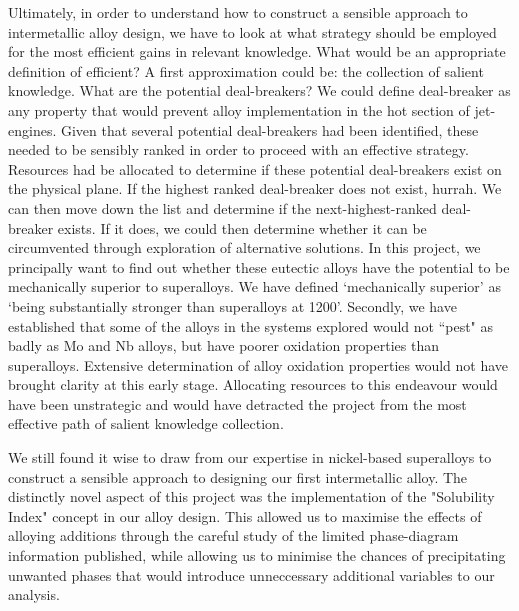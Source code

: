 Ultimately, in order to understand how to construct a sensible approach to intermetallic alloy design, we have to look at what strategy should be employed for the most efficient gains in relevant knowledge.  What would be an appropriate definition of efficient?  A first approximation could be: the collection of salient knowledge.  What are the potential deal-breakers?  We could define deal-breaker as any property that would prevent alloy implementation in the hot section of jet-engines.  Given that several potential deal-breakers had been identified, these needed to be sensibly ranked in order to proceed with an effective strategy.  Resources had be allocated to determine if these potential deal-breakers exist on the physical plane.  If the highest ranked deal-breaker does not exist, hurrah.  We can then move down the list and determine if the next-highest-ranked deal-breaker exists.  If it does, we could then determine whether it can be circumvented through exploration of alternative solutions.   In this project, we principally want to find out whether these eutectic alloys have the potential to be mechanically superior to superalloys.  We have defined `mechanically superior' as `being substantially stronger than superalloys at 1200\celsius'.  Secondly, we have established that some of the alloys in the systems explored would not ``pest" as badly as Mo and Nb alloys, but have poorer oxidation properties than superalloys.  Extensive determination of alloy oxidation properties would not have brought clarity at this early stage.  Allocating resources to this endeavour would have been unstrategic and would have detracted the project from the most effective path of salient knowledge collection.  


We still found it wise to draw from our expertise in nickel-based superalloys to construct a sensible approach to designing our first intermetallic alloy.  The distinctly novel aspect of this project was the implementation of the "Solubility Index" concept in our alloy design.  This allowed us to maximise the effects of alloying additions through the careful study of the limited phase-diagram information published, while allowing us to minimise the chances of precipitating unwanted phases that would introduce unneccessary additional variables to our analysis.
  
